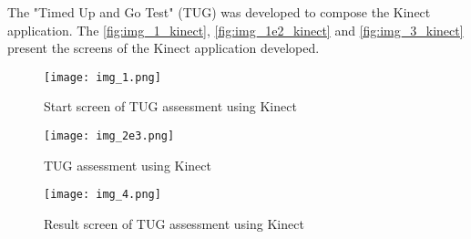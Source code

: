 The "Timed Up and Go Test" (TUG) was developed to compose the Kinect application. The \autoref{fig:img_1_kinect}, \autoref{fig:img_1e2_kinect} and \autoref{fig:img_3_kinect} present the screens of the Kinect application developed.

\begin{figure}[htb]
\caption{Start screen of TUG assessment using Kinect}
 \label{fig:img_1_kinect}
 \centering
 \texttt{[image: img\_1.png]}
 \fautor
\end{figure}

\begin{figure}[htb]
\caption{TUG assessment using Kinect}
 \label{fig:img_1e2_kinect}
 \centering
 \texttt{[image: img\_2e3.png]}
 \fautor
\end{figure}

\begin{figure}[htb]
\caption{Result screen of TUG assessment using Kinect}
 \label{fig:img_3_kinect}
 \centering
 \texttt{[image: img\_4.png]}
 \fautor
\end{figure}
